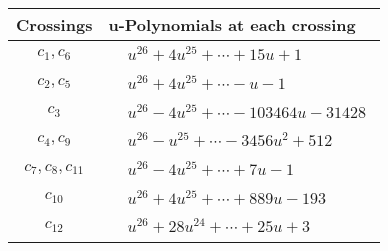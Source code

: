 \documentclass[1p]{elsarticle_modified}
\theoremstyle{definition}
\begin{document}
\begin{tabular}{m{50pt}|m{274pt}}
Crossings & \hspace{64pt}u-Polynomials at each crossing \\
\hline $$\begin{aligned}c_{1},c_{6}\end{aligned}$$&$\begin{aligned}
&u^{26}+4 u^{25}+\cdots+15 u+1
\end{aligned}$\\
\hline $$\begin{aligned}c_{2},c_{5}\end{aligned}$$&$\begin{aligned}
&u^{26}+4 u^{25}+\cdots- u-1
\end{aligned}$\\
\hline $$\begin{aligned}c_{3}\end{aligned}$$&$\begin{aligned}
&u^{26}-4 u^{25}+\cdots-103464 u-31428
\end{aligned}$\\
\hline $$\begin{aligned}c_{4},c_{9}\end{aligned}$$&$\begin{aligned}
&u^{26}- u^{25}+\cdots-3456 u^2+512
\end{aligned}$\\
\hline $$\begin{aligned}c_{7},c_{8},c_{11}\end{aligned}$$&$\begin{aligned}
&u^{26}-4 u^{25}+\cdots+7 u-1
\end{aligned}$\\
\hline $$\begin{aligned}c_{10}\end{aligned}$$&$\begin{aligned}
&u^{26}+4 u^{25}+\cdots+889 u-193
\end{aligned}$\\
\hline $$\begin{aligned}c_{12}\end{aligned}$$&$\begin{aligned}
&u^{26}+28 u^{24}+\cdots+25 u+3
\end{aligned}$\\
\hline
\end{tabular}\\~\\
\newpage\renewcommand{\arraystretch}{1}
\end{document}
